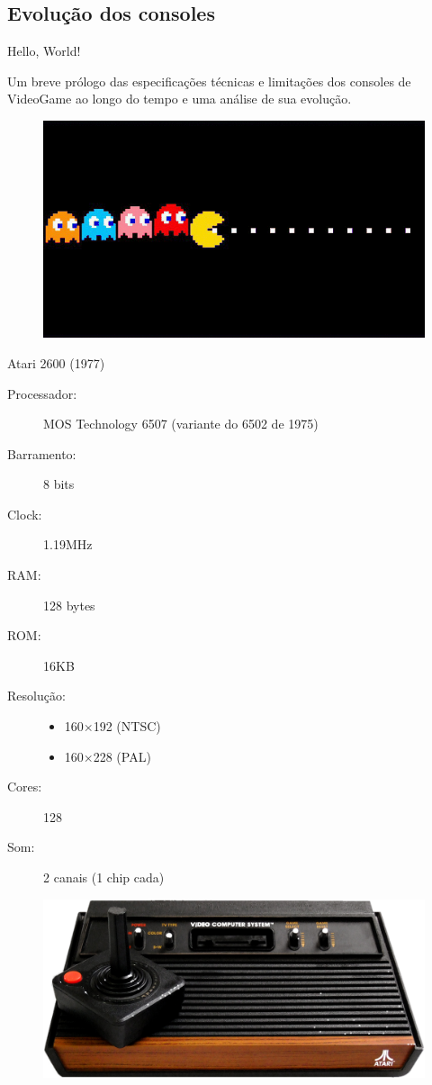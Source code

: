 \documentclass{beamer}
\begin{document}
\begin{darkframes}
\subsection{Evolução dos consoles}
\begin{frame}{\huge Hello, World!}
    \begin{multicols}{2}
        Um breve prólogo das especificações técnicas e limitações dos consoles de
        VideoGame ao longo do tempo e uma análise de sua evolução.
        \begin{figure}[h!]
            \centering
            \includegraphics[width=.5\textwidth]{pacman}
        \end{figure}
    \end{multicols}
\end{frame}

\begin{frame}{Atari 2600 (1977)}
    \begin{multicols}{2}
        \begin{description}
            \item[Processador:] MOS Technology 6507 (variante do 6502 de 1975)
            \item[Barramento:] 8 bits
            \item[Clock:] 1.19MHz
            \item[RAM:] 128 bytes
            \item[ROM:] 16KB
            \item[Resolução:]
                \begin{itemize}
                    \item 160$\times$192 (NTSC)
                    \item 160$\times$228 (PAL)
                \end{itemize}
            \item[Cores:] 128
            \item[Som:] 2 canais (1 chip cada)
        \end{description}
    \end{multicols}
    \begin{figure}[h!]
        \centering
        \includegraphics[width=.5\textwidth]{Atari2600}
    \end{figure}
\end{frame}


\end{darkframes}
\end{document}
